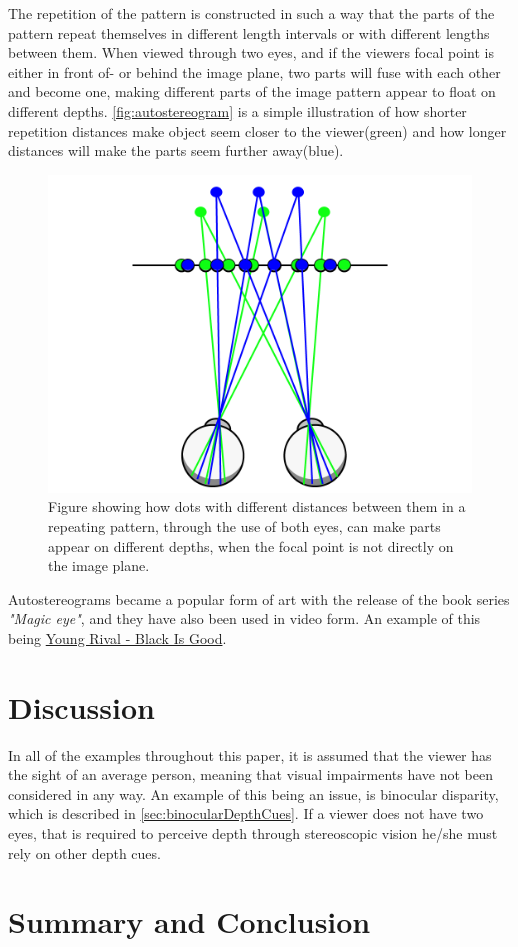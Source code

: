 The repetition of the pattern is constructed in such a way that the parts of the pattern repeat themselves in different length intervals or with different lengths between them. When viewed through two eyes, and if the viewers focal point is either in front of- or behind the image plane, two parts will fuse with each other and become one, making different parts of the image pattern appear to float on different depths\citep{autostereogramNguyen}. \autoref{fig:autostereogram} is a simple illustration of how shorter repetition distances make object seem closer to the viewer(green) and how longer distances will make the parts seem further away(blue). 

\begin{figure}[H]
	\centering
	\includegraphics[width=0.8\linewidth]{figure/Analysis/autoStereogram.png}
	\caption{Figure showing how dots with different distances between them in a repeating pattern, through the use of both eyes, can make parts appear on different depths, when the focal point is not directly on the image plane.}
	\label{fig:autostereogram}
\end{figure}

Autostereograms became a popular form of art with the release of the book series \textit{"Magic eye"}\citep{autostereograms}, and they have also been used in video form. An example of this being \href{https://www.youtube.com/watch?v=2AKtp3XHn38}{\color{blue}Young Rival - Black Is Good}.

\section{Discussion}
In all of the examples throughout this paper, it is assumed that the viewer has the sight of an average person, meaning that visual impairments have not been considered in any way. An example of this being an issue, is binocular disparity, which is described in \autoref{sec:binocularDepthCues}. If a viewer does not have two eyes, that is required to perceive depth through stereoscopic vision he/she must rely on other depth cues.\\


\section{Summary and Conclusion}


